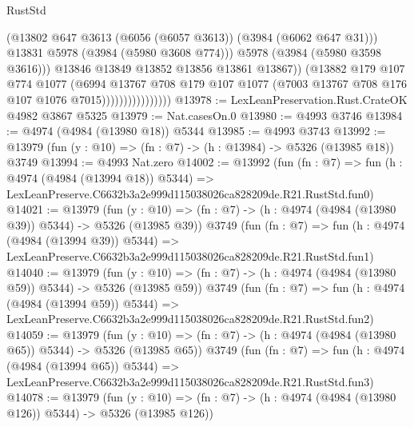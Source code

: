 \begin{lexlean}{RustStd}
\begin{coremodule}
                                      (@13802
                                        @647
                                        @3613
                                        (@6056 (@6057 @3613))
                                        (@3984 (@6062 @647 @31)))
                                      @13831
                                      @5978
                                      (@3984 (@5980 @3608 @774)))
                                    @5978
                                    (@3984 (@5980 @3598 @3616)))
                                  @13846
                                  @13849
                                  @13852
                                  @13856
                                  @13861
                                  @13867))
                              (@13882
                                @179
                                @107
                                @774
                                @1077
                                (@6994
                                  @13767
                                  @708
                                  @179
                                  @107
                                  @1077
                                  (@7003 @13767 @708 @176 @107 @1076 @7015))))))))))))))))
@13978 := LexLeanPreservation.Rust.CrateOK @4982 @3867 @5325
@13979 := Nat.casesOn.{0}
@13980 := @4993 @3746
@13984 := @4974 (@4984 (@13980 @18)) @5344
@13985 := @4993 @3743
@13992 := @13979 (fun (y : @10) => (fn : @7) -> (h : @13984) -> @5326 (@13985 @18)) @3749
@13994 := @4993 Nat.zero
@14002 := @13992
    (fun (fn : @7) =>
    fun (h : @4974 (@4984 (@13994 @18)) @5344) =>
    LexLeanPreserve.C6632b3a2e999d115038026ca828209de.R21.RustStd.fun0)
@14021 := @13979
    (fun (y : @10) => (fn : @7) -> (h : @4974 (@4984 (@13980 @39)) @5344) -> @5326 (@13985 @39))
    @3749
    (fun (fn : @7) =>
    fun (h : @4974 (@4984 (@13994 @39)) @5344) =>
    LexLeanPreserve.C6632b3a2e999d115038026ca828209de.R21.RustStd.fun1)
@14040 := @13979
    (fun (y : @10) => (fn : @7) -> (h : @4974 (@4984 (@13980 @59)) @5344) -> @5326 (@13985 @59))
    @3749
    (fun (fn : @7) =>
    fun (h : @4974 (@4984 (@13994 @59)) @5344) =>
    LexLeanPreserve.C6632b3a2e999d115038026ca828209de.R21.RustStd.fun2)
@14059 := @13979
    (fun (y : @10) => (fn : @7) -> (h : @4974 (@4984 (@13980 @65)) @5344) -> @5326 (@13985 @65))
    @3749
    (fun (fn : @7) =>
    fun (h : @4974 (@4984 (@13994 @65)) @5344) =>
    LexLeanPreserve.C6632b3a2e999d115038026ca828209de.R21.RustStd.fun3)
@14078 := @13979
    (fun (y : @10) => (fn : @7) -> (h : @4974 (@4984 (@13980 @126)) @5344) -> @5326 (@13985 @126))

\end{coremodule}
\end{lexlean}
